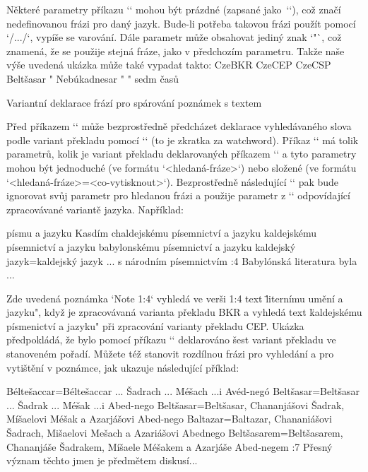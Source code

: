Některé parametry příkazu `\vdef` mohou být prázdné (zapsané jako~`{}`),
což značí nedefinovanou frázi pro daný jazyk.
Bude-li potřeba takovou frázi použít pomocí `\x/.../`, vypíše se varování.
Dále parametr může obsahovat jediný znak `"`, což znamená, že se
použije stejná fráze, jako v předchozím parametru. Takže naše
výše uvedená ukázka může také vypadat takto:
\begtt
{} {CzeBKR}         {CzeCEP}       {CzeCSP}
       {Beltšasar}    {"}
 {Nebúkadnesar} {"}
       {"}            {sedm časů}
\endtt


\secc[ww] Variantní deklarace frází pro spárování poznámek s textem

\mnote{\code{\\ww}}
Před příkazem `\Note` může bezprostředně předcházet deklarace vyhledávaného
slova podle variant překladu pomocí `\ww` (to je zkratka za watchword).
Příkaz `\ww` má tolik parametrů, kolik je variant překladu deklarovaných
příkazem `\variants` a tyto parametry mohou být jednoduché (ve formátu
`{<hledaná-fráze>}`) nebo složené (ve formátu
`{<hledaná-fráze>}={<co-vytisknout>}`). Bezprostředně následující `\Note`
pak bude ignorovat svůj parametr pro hledanou frázi a použije parametr z `\ww`
odpovídající zpracovávané variantě jazyka. Například:

\begtt
{}  %
    {písmu a jazyku Kasdím} %
    {chaldejskému písemnictví a jazyku}  %
    {kaldejskému písemnictví a jazyku} %
    {babylonskému písemnictví a jazyku}  %
    {kaldejský jazyk}={kaldejský jazyk ... s národním písemnictvím}  %
:4 {} Babylónská literatura byla ...
\endtt

Zde uvedená poznámka `Note 1:4` vyhledá ve verši 1:4 text \"liternímu umění a jazyku",
když je zpracovávaná varianta překladu BKR a vyhledá text
\"kaldejskému písmenictví a jazyku" při zpracování varianty překladu CEP.
Ukázka předpokládá, že bylo pomocí příkazu `\variants` deklarováno šest
variant překladu ve stanoveném pořadí. Můžete též stanovit rozdílnou frázi
pro vyhledání a pro vytištění v poznámce, jak ukazuje následující příklad:

\begtt
{}  %
    {Béltešaccar}={Béltešaccar ... Šadrach ... Méšach ...i Avéd-negó} %
    {Beltšasar}={Beltšasar ... Šadrak ... Méšak ...i Abed-nego}  %
    {Beltšasar}={Beltšasar, Chananjášovi Šadrak, Míšaelovi Méšak a Azarjášovi Abed-nego}
    {Baltazar}={Baltazar, Chananiášovi Šadrach, Mišaelovi Mešach a Azariášovi Abednego}
    {Beltšasarem}={Beltšasarem, Chananjáše Šadrakem, Míšaele Méšakem a Azarjáše Abed-negem}
:7  {} Přesný význam těchto jmen je předmětem diskusí...
\endtt

